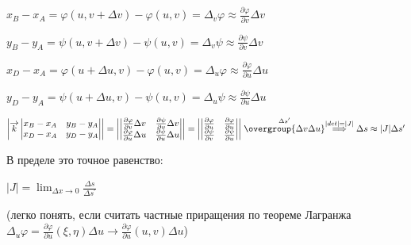 \documentclass[12pt]{article}
\begin{document}
    $x_B - x_A = \varphi(u, v + \Delta v) - \varphi(u, v) = \Delta_v \varphi \approx \frac{\partial \varphi}{\partial v}\Delta v$

    $y_B - y_A = \psi(u, v + \Delta v) - \psi(u, v) = \Delta_v \psi \approx \frac{\partial \psi}{\partial v}\Delta v$

    $x_D - x_A = \varphi(u + \Delta u, v) - \varphi(u, v) = \Delta_u \varphi \approx \frac{\partial \varphi}{\partial u}\Delta u$

    $y_D - y_A = \psi(u + \Delta u, v) - \psi(u, v) = \Delta_u \psi \approx \frac{\partial \psi}{\partial u}\Delta u$

    $\left| \overrightarrow{k}
    \begin{vmatrix}
        x_B - x_A & y_B - y_A \\
        x_D - x_A & y_D - y_A
    \end{vmatrix}\right| = \left|
    \begin{vmatrix}
        \frac{\partial \varphi}{\partial v}\Delta v & \frac{\partial \psi}{\partial v}\Delta v \\
        \frac{\partial \varphi}{\partial u}\Delta u & \frac{\partial \psi}{\partial u}\Delta u
    \end{vmatrix}\right| = \left|
    \begin{vmatrix}
        \frac{\partial \varphi}{\partial u} & \frac{\partial \varphi}{\partial u} \\
        \frac{\partial \psi}{\partial v}    & \frac{\partial \psi}{\partial u}
    \end{vmatrix}\right| \stackrel{\Delta s^\prime}{\overgroup{\Delta v \Delta u}} \stackrel{|det| = |J|}{\Longrightarrow} \Delta s \approx |J|\Delta s^\prime$

    \Nota В пределе это точное равенство:

    $|J| = \lim_{\Delta x \to 0} \frac{\Delta s}{\Delta s^\prime}$

    (легко понять, если считать частные приращения по теореме Лагранжа $\Delta_u \varphi = \frac{\partial \varphi}{\partial u}(\xi, \eta) \Delta u \rightarrow \frac{\partial \varphi}{\partial u}(u, v) \Delta u$)
\end{document}
